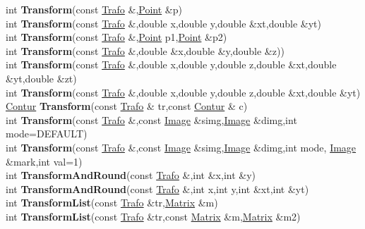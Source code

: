 \documentclass[10pt,titlepage]{article}
\def\functionlistentry#1#2#3#4#5#6{\noindent #1 {\bf #2}(#3) \dotfill #6\\}
\begin{document}
{{\functionlistentry{int}{Transform}{const \hyperlink{Trafo}{Trafo} \&,\hyperlink{Point}{Point} \&p}{715}{geoTrafo}{}
\functionlistentry{int}{Transform}{const \hyperlink{Trafo}{Trafo} \&,double x,double y,double \&xt,double \&yt}{716}{geoTrafo}{}
\functionlistentry{int}{Transform}{const \hyperlink{Trafo}{Trafo} \&,\hyperlink{Point}{Point} p1,\hyperlink{Point}{Point} \&p2}{717}{geoTrafo}{}
\functionlistentry{int}{Transform}{const \hyperlink{Trafo}{Trafo} \&,double \&x,double \&y,double \&z)}{720}{geoTrafo}{}
\functionlistentry{int}{Transform}{const \hyperlink{Trafo}{Trafo} \&,double x,double y,double z,double \&xt,double \&yt,double \&zt}{721}{geoTrafo}{}
\functionlistentry{int}{Transform}{const \hyperlink{Trafo}{Trafo} \&,double x,double y,double z,double \&xt,double \&yt}{722}{geoTrafo}{}
\functionlistentry{\hyperlink{Contur}{Contur}}{Transform}{const \hyperlink{Trafo}{Trafo} \& tr,const \hyperlink{Contur}{Contur} \& c}{725}{geoTrafo}{}
\functionlistentry{int}{Transform}{const \hyperlink{Trafo}{Trafo} \&,const \hyperlink{Image}{Image} \&simg,\hyperlink{Image}{Image} \&dimg,int mode=DEFAULT}{726}{geoTrafo}{}
\functionlistentry{int}{Transform}{const \hyperlink{Trafo}{Trafo} \&,const \hyperlink{Image}{Image} \&simg,\hyperlink{Image}{Image} \&dimg,int mode, \hyperlink{Image}{Image} \&mark,int val=1}{727}{geoTrafo}{}
\functionlistentry{int}{TransformAndRound}{const \hyperlink{Trafo}{Trafo} \&,int \&x,int \&y}{718}{geoTrafo}{}
\functionlistentry{int}{TransformAndRound}{const \hyperlink{Trafo}{Trafo} \&,int x,int y,int \&xt,int \&yt}{719}{geoTrafo}{}
\functionlistentry{int}{TransformList}{const \hyperlink{Trafo}{Trafo} \&tr,\hyperlink{Matrix}{Matrix} \&m}{723}{geoTrafo}{}
\functionlistentry{int}{TransformList}{const \hyperlink{Trafo}{Trafo} \&tr,const \hyperlink{Matrix}{Matrix} \&m,\hyperlink{Matrix}{Matrix} \&m2}{724}{geoTrafo}{}

}}
\end{document}
